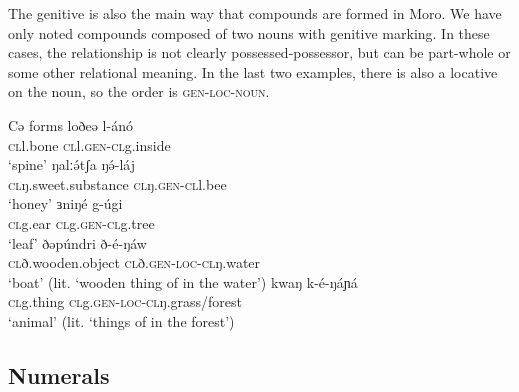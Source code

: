 The genitive is also the main way that compounds are formed in Moro. We have only noted compounds composed of two nouns with genitive marking. In these cases, the relationship is not clearly possessed-possessor, but can be part-whole or some other relational meaning. In the last two examples, there is also a locative on the noun, so the order is \textsc{gen}-\textsc{loc}-\textsc{noun}. %

\ea Cə forms
	\ea \gll	loðeə 		l-ánó\\
		\textsc{cl}l.bone  	\textsc{cl}l.\textsc{gen}-\textsc{cl}g.inside	\\
		\glt `spine’  
	\ex \gll	ŋalːə́tʃa		ŋə́-láj\\
		{\textsc{cl}ŋ.sweet.substance}  	\textsc{cl}ŋ.\textsc{gen}-\textsc{cl}l.bee\\
		\glt `honey’
	\ex \gll ɜniŋé 		g-úgi	\\
			\textsc{cl}g.ear  	\textsc{cl}g.\textsc{gen}-\textsc{cl}g.tree\\
		\glt `leaf’
	\ex \gll ðəpúndri 			ð-é-ŋáw\\
			{\textsc{cl}ð.wooden.object}  	 \textsc{cl}ð.\textsc{gen}-\textsc{loc}-\textsc{cl}ŋ.water\\
		\glt `boat’ (lit. `wooden thing of in the water')
	\ex	\gll kwaŋ 		k-é-ŋáɲá	\\			
		\textsc{cl}g.thing  	 \textsc{cl}g.\textsc{gen}-\textsc{loc}-\textsc{cl}ŋ.grass/forest \\
		\glt `animal’ (lit. `things of in the forest') 


		
	\z 
\z




\subsection{Numerals}

